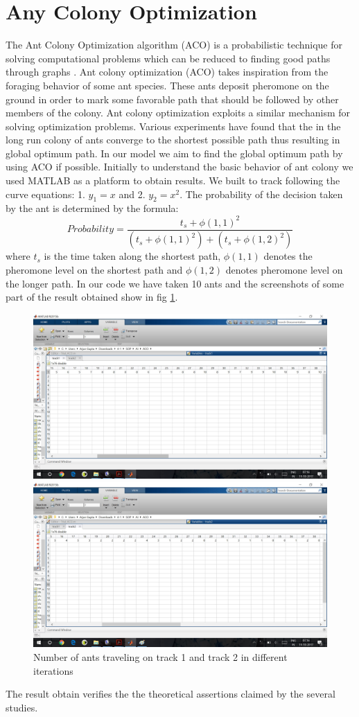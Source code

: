 \documentclass[a4paper, 12pt]{article}
\begin{document}
\section{Any Colony Optimization}
The Ant Colony Optimization algorithm (ACO) is a probabilistic technique for solving computational problems which can be reduced to finding good paths through graphs \cite{refer1}. Ant colony optimization (ACO) takes inspiration from the foraging behavior of some ant species. These ants deposit pheromone on the ground in order to mark some favorable path that should be followed by other members of the colony. Ant colony optimization exploits a similar mechanism for solving optimization problems. Various experiments have found that the in the long run colony of ants converge to the shortest possible path thus resulting in global optimum path. In our model we aim to find the global optimum path by using ACO if possible. Initially to understand the basic behavior of ant colony we used MATLAB as a platform to obtain results. We built to track following the curve equations: 1. $y_1 = x$ and 2. $y_2 = x^2$. The probability of the decision taken by the ant is determined by the formula:
\begin{equation}
Probability = \frac{t_s + \phi(1,1)^2}{(t_s + \phi(1,1)^2)+(t_s + \phi(1,2)^2)}
\end{equation}
where $t_s$ is the time taken along the shortest path, $\phi(1,1)$ denotes the pheromone level on the shortest path and $\phi(1,2)$ denotes pheromone level on the longer path. In our code we have taken 10 ants and the screenshots of some part of the result obtained show in fig \ref{fig1}. 
\begin{figure}[!h]
\includegraphics[height = 2 in, width= \linewidth]{ACO_track1.png}

\includegraphics[height = 2 in, width= \linewidth]{ACO_track2.png}
\caption{Number of ants traveling on track 1 and  track 2 in different iterations}
\label{fig1}
\end{figure}
The result obtain verifies the the theoretical assertions claimed by the several studies. 
\end{document}
